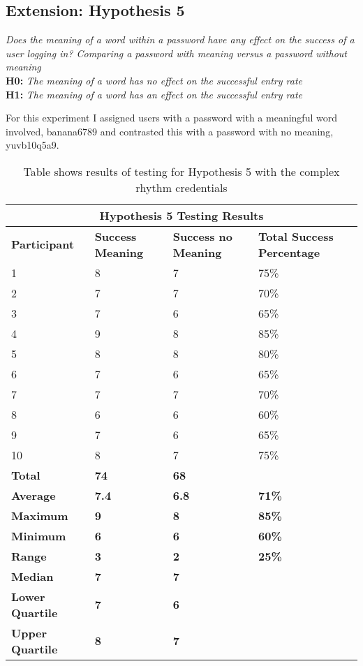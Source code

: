 \documentclass{article}
\begin{document}
\subsection{Extension: Hypothesis 5}
\begin{center}
\textit{Does the meaning of a word within a password have any effect on the success of a user logging in? Comparing a password with meaning versus a password without meaning} \newline \\
\textbf{H0:} \textit{The meaning of a word has no effect on the successful entry rate} \newline \\
\textbf{H1:} \textit{The meaning of a word has an effect on the successful entry rate}
\end{center}

For this experiment I assigned users with a password with a meaningful word involved, banana6789 and contrasted this with a password with no meaning, yuvb10q5a9.  

{
\begin{table} [H]
\centering
\begin{tabular}{ |p{2cm}|p{4cm}|p{4cm}| p{4cm} | }
\hline
\multicolumn{4}{|c|}{\textbf{Hypothesis 5 Testing Results}} \\
\hline
\textbf{Participant} & \textbf{Success Meaning} & \textbf{Success no Meaning} & \textbf{Total Success Percentage} \\
\hline
1 & 8 & 7 & 75\% \\
\hline
2 & 7 & 7 & 70\% \\
\hline
3 & 7 & 6 & 65\% \\
\hline
4 & 9 & 8 & 85\%  \\
\hline
5 & 8 & 8 & 80\% \\
\hline
6 & 7 & 6 & 65\% \\
\hline
7 & 7 & 7 & 70\% \\
\hline
8 & 6 & 6 & 60\% \\
\hline
9 & 7 & 6 & 65\% \\
\hline
10 & 8 & 7 & 75\% \\
\hline
\textbf{Total} & \textbf{74} & \textbf{68} & \\
\hline
\textbf{Average} & \textbf{7.4} & \textbf{6.8} & \textbf{71\%} \\
\hline
\textbf{Maximum} & \textbf{9} & \textbf{8} & \textbf{85\%} \\
\hline
\textbf{Minimum} & \textbf{6} & \textbf{6} & \textbf{60\%} \\
\hline
\textbf{Range} & \textbf{3} & \textbf{2} & \textbf{25\%} \\
\hline
\textbf{Median} & \textbf{7} & \textbf{7} & \\
\hline
\textbf{Lower Quartile} & \textbf{7} & \textbf{6} & \\
\hline
\textbf{Upper Quartile} & \textbf{8} & \textbf{7} & \\
\hline
\end{tabular}
\caption{Table shows results of testing for Hypothesis 5 with the complex rhythm credentials}
\label{table:6}
\end{table}
}
\end{document}
